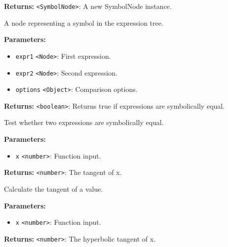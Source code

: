 \documentclass[12pt,a4paper]{article}
\begin{document}
\noindent \textbf{Returns:} \texttt{<SymbolNode>}: A new SymbolNode instance.

\noindent A node representing a symbol in the expression tree.

\vspace{5mm}
\noindent {}


\noindent \textbf{Parameters:}
\begin{itemize}
  \item \texttt{expr1} \texttt{<Node>}: First expression.
  \item \texttt{expr2} \texttt{<Node>}: Second expression.
  \item \texttt{options} \texttt{<Object>}: Comparison options.
\end{itemize}

\noindent \textbf{Returns:} \texttt{<boolean>}: Returns true if expressions are symbolically equal.

\noindent Test whether two expressions are symbolically equal.

\vspace{5mm}
\noindent {}


\noindent \textbf{Parameters:}
\begin{itemize}
  \item \texttt{x} \texttt{<number>}: Function input.
\end{itemize}

\noindent \textbf{Returns:} \texttt{<number>}: The tangent of x.

\noindent Calculate the tangent of a value.

\vspace{5mm}
\noindent {}


\noindent \textbf{Parameters:}
\begin{itemize}
  \item \texttt{x} \texttt{<number>}: Function input.
\end{itemize}

\noindent \textbf{Returns:} \texttt{<number>}: The hyperbolic tangent of x.
\end{document}
